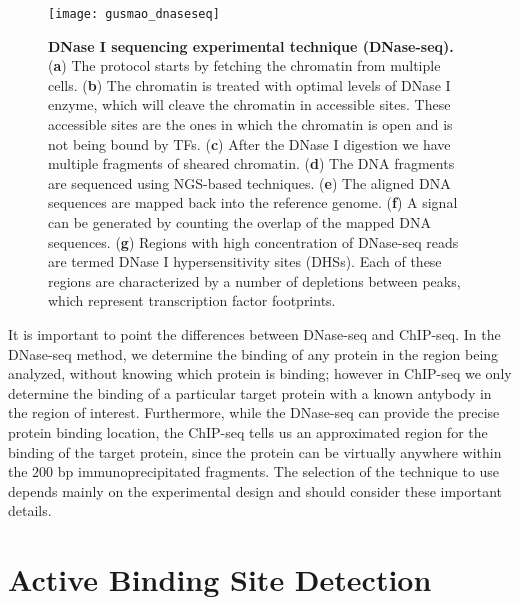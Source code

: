 \begin{figure}[h!]
\centering
\texttt{[image: gusmao\_dnaseseq]}
\caption[DNase I sequencing experimental technique (DNase-seq)]{\textbf{DNase I sequencing experimental technique (DNase-seq).} (\textbf{a}) The protocol starts by fetching the chromatin from multiple cells. (\textbf{b}) The chromatin is treated with optimal levels of DNase I enzyme, which will cleave the chromatin in accessible sites. These accessible sites are the ones in which the chromatin is open and is not being bound by TFs. (\textbf{c}) After the DNase I digestion we have multiple fragments of sheared chromatin. (\textbf{d}) The DNA fragments are sequenced using NGS-based techniques. (\textbf{e}) The aligned DNA sequences are mapped back into the reference genome. (\textbf{f}) A signal can be generated by counting the overlap of the mapped DNA sequences. (\textbf{g}) Regions with high concentration of DNase-seq reads are termed DNase I hypersensitivity sites (DHSs). Each of these regions are characterized by a number of depletions between peaks, which represent transcription factor footprints.}
\label{fig:gusmao_dnaseseq}
\end{figure}

It is important to point the differences between DNase-seq and ChIP-seq. In the DNase-seq method, we determine the binding of any protein in the region being analyzed, without knowing which protein is binding; however in ChIP-seq we only determine the binding of a particular target protein with a known antybody in the region of interest. Furthermore, while the DNase-seq can provide the precise protein binding location, the ChIP-seq tells us an approximated region for the binding of the target protein, since the protein can be virtually anywhere within the \approxy$200$ bp immunoprecipitated fragments. The selection of the technique to use depends mainly on the experimental design and should consider these important details.

\section{Active Binding Site Detection}
\label{sec:active.binding.site.detection}

